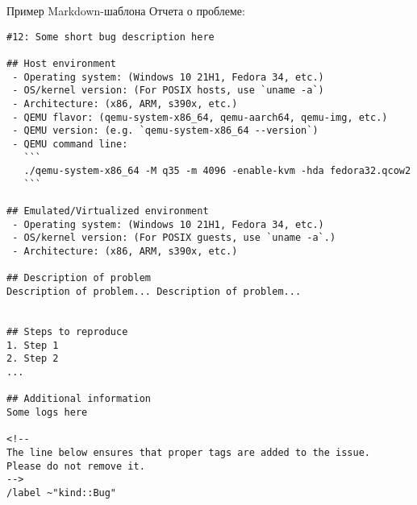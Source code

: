 
\pagebreak
\begin{center}
\end{center}

Пример Markdown-шаблона Отчета о проблеме:

\begin{lstlisting}[label={lst:bugreport}]
#12: Some short bug description here

## Host environment
 - Operating system: (Windows 10 21H1, Fedora 34, etc.)
 - OS/kernel version: (For POSIX hosts, use `uname -a`)
 - Architecture: (x86, ARM, s390x, etc.)
 - QEMU flavor: (qemu-system-x86_64, qemu-aarch64, qemu-img, etc.)
 - QEMU version: (e.g. `qemu-system-x86_64 --version`)
 - QEMU command line:
   ```
   ./qemu-system-x86_64 -M q35 -m 4096 -enable-kvm -hda fedora32.qcow2
   ```

## Emulated/Virtualized environment
 - Operating system: (Windows 10 21H1, Fedora 34, etc.)
 - OS/kernel version: (For POSIX guests, use `uname -a`.)
 - Architecture: (x86, ARM, s390x, etc.)

## Description of problem
Description of problem... Description of problem...


## Steps to reproduce
1. Step 1
2. Step 2
...

## Additional information
Some logs here

<!--
The line below ensures that proper tags are added to the issue.
Please do not remove it.
-->
/label ~"kind::Bug"

\end{lstlisting}